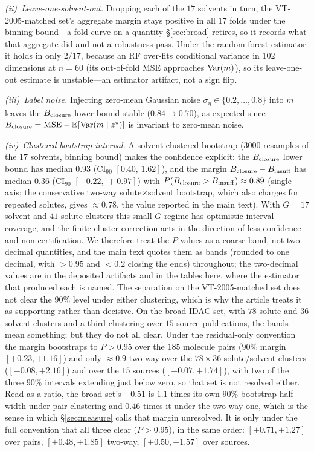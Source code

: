 \emph{(ii)~Leave-one-solvent-out.} Dropping each of the $17$ solvents in turn, the VT-2005-matched set's
aggregate margin stays positive in all
$17$ folds under the binning bound---a fold curve on a quantity \S\ref{sec:broad} retires, so it
records what that aggregate did and not a robustness pass. Under the random-forest estimator it holds in only $2/17$, because an RF
over-fits conditional variance in $102$ dimensions at $n{=}60$ (its out-of-fold MSE approaches $\mathrm{Var}(m)$),
so its leave-one-out estimate is unstable---an estimator artifact, not a sign flip.

\emph{(iii)~Label noise.} Injecting zero-mean Gaussian noise $\sigma_\eta\in\{0.2,\dots,0.8\}$ into $m$
leaves the $B_{\mathrm{closure}}$ lower bound stable ($0.84\to0.70$), as expected since
$B_{\mathrm{closure}}=\mathrm{MSE}-\mathbb{E}[\mathrm{Var}(m\mid z^\star)]$ is invariant to zero-mean noise.

\emph{(iv)~Clustered-bootstrap interval.} A solvent-clustered bootstrap ($3000$ resamples of the $17$
solvents, binning bound) makes the confidence explicit: the $B_{\mathrm{closure}}$ lower bound has median $0.93$
(CI$_{90}$ $[0.40,\,1.62]$), and the margin $B_{\mathrm{closure}}-B_{\mathrm{insuff}}$ has median $0.36$ (CI$_{90}$ $[-0.22,\,+0.97]$)
with $P(B_{\mathrm{closure}}>B_{\mathrm{insuff}})\approx0.89$ (single-axis; the conservative two-way solute$\times$solvent bootstrap,
which also charges for repeated solutes, gives $\approx0.78$, the value reported in the main text). With
$G=17$ solvent and $41$ solute clusters this small-$G$ regime has optimistic interval coverage, and the
finite-cluster correction acts in the direction of less confidence and non-certification. We
therefore treat the $P$ values as a coarse band, not two-decimal quantities, and the main text quotes
them as bands (rounded to one decimal, with $>0.95$ and $<0.2$ closing the ends) throughout; the
two-decimal values are in the deposited artifacts and in the tables here, where the estimator that
produced each is named. The separation on the VT-2005-matched set does not
clear the $90\%$ level under either clustering, which is
why the article treats it as supporting rather than decisive. On the broad IDAC set, with $78$
solute and $36$ solvent clusters and a third clustering over $15$ source publications, the bands mean
something; but they do not all clear. Under the residual-only convention the margin
bootstraps to $P>0.95$ over the $185$ molecule pairs ($90\%$ margin $[+0.23,+1.16]$) and only
${\approx}0.9$ two-way over the $78\times36$ solute/solvent clusters ($[-0.08,+2.16]$) and over the
$15$ sources ($[-0.07,+1.74]$), with two
of the three $90\%$ intervals extending just below zero, so that set is not resolved either. Read as a
ratio, the broad set's $+0.51$ is $1.1$ times its own $90\%$ bootstrap half-width under pair
clustering and $0.46$ times it under the two-way one, which is the sense in which \S\ref{sec:measure}
calls that margin unresolved. It is only
under the full convention that all three clear ($P>0.95$), in the same order: $[+0.71,+1.27]$ over
pairs, $[+0.48,+1.85]$ two-way, $[+0.50,+1.57]$ over sources.

